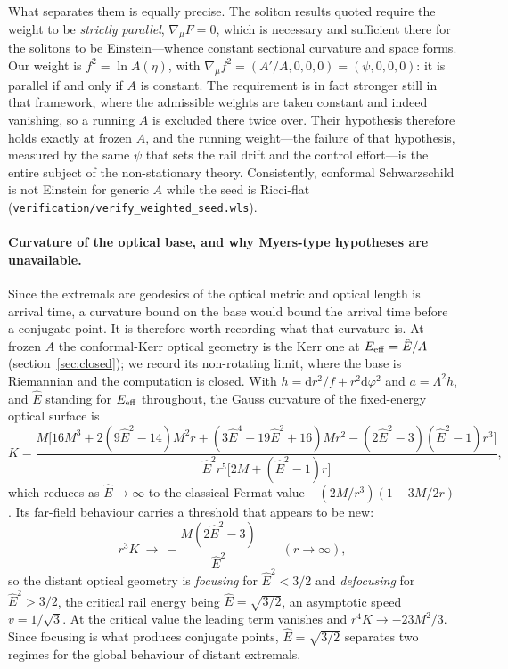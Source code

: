 \documentclass[12pt]{iopart}
\theoremstyle{plain}
\theoremstyle{definition}
\theoremstyle{remark}
\newcommand{\Ehat}{\hat E}
\newcommand{\dd}{\mathrm{d}}
\begin{document}
What separates them is equally precise. The soliton results quoted require the
weight to be \emph{strictly parallel}, $\nabla_\mu F=0$, which is necessary and
sufficient there for the solitons to be Einstein---whence constant sectional
curvature and space forms. Our weight is $f^2=\ln A(\eta)$, with
$\nabla_\mu f^2=(A'/A,0,0,0)=(\psi,0,0,0)$: it is parallel if and only if $A$ is
constant. The requirement is in fact stronger still in that framework, where the
admissible weights are taken constant and indeed vanishing, so a running $A$ is
excluded there twice over. Their hypothesis therefore holds exactly at frozen $A$, and the running
weight---the failure of that hypothesis, measured by the same $\psi$ that
sets the rail drift and the control effort---is the entire subject of the
non-stationary theory. Consistently, conformal Schwarzschild is not Einstein for
generic $A$ while the seed is Ricci-flat
(\texttt{verification/verify\_weighted\_seed.wls}).

\paragraph{Curvature of the optical base, and why Myers-type hypotheses are
unavailable.} Since the extremals are geodesics of the optical metric and optical
length is arrival time, a curvature bound on the base would bound the arrival
time before a conjugate point. It is therefore worth recording what that
curvature is. At frozen $A$ the conformal-Kerr optical geometry is the Kerr one
at $E_{\rm eff}=\Ehat/A$ (section~\ref{sec:closed}); we record its
non-rotating limit, where the base is Riemannian and the computation is closed.
With $h=\dd r^2/f+r^2\dd\varphi^2$ and $a=\Lambda^2h$, and $\Ehat$ standing for
$E_{\rm eff}$ throughout, the Gauss curvature of the fixed-energy optical
surface is
\begin{equation}
    K=\frac{M\big[16M^3+2(9\Ehat^2\!-\!14)M^2r
      +(3\Ehat^4\!-\!19\Ehat^2\!+\!16)Mr^2
      -(2\Ehat^2\!-\!3)(\Ehat^2\!-\!1)r^3\big]}
      {\Ehat^2r^5\big[2M+(\Ehat^2-1)r\big]} ,
    \label{eq:optical-gauss}
\end{equation}
which reduces as $\Ehat\to\infty$ to the classical Fermat value
$-(2M/r^3)(1-3M/2r)$. Its far-field behaviour carries a threshold that appears to
be new:
\begin{equation}
    r^3K\ \longrightarrow\ -\frac{M(2\Ehat^2-3)}{\Ehat^2}
    \qquad (r\to\infty),
    \label{eq:optical-asym}
\end{equation}
so the distant optical geometry is \emph{focusing} for $\Ehat^2<3/2$ and
\emph{defocusing} for $\Ehat^2>3/2$, the critical rail energy being
$\Ehat=\sqrt{3/2}$, an asymptotic speed $v=1/\sqrt3$. At the critical value the
leading term vanishes and $r^4K\to-23M^2/3$. Since focusing is what produces
conjugate points, $\Ehat=\sqrt{3/2}$ separates two regimes for the global
behaviour of distant extremals.
\end{document}

